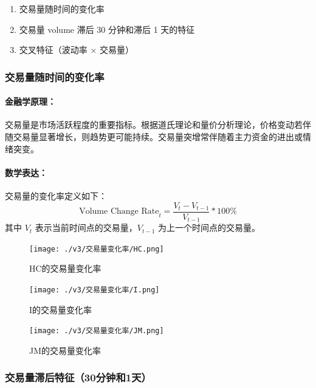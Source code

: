 \documentclass[a4paper,11pt]{ctexart}
\begin{document}
\begin{enumerate}
  \item 交易量随时间的变化率
  \item 交易量 volume 滞后 30 分钟和滞后 1 天的特征
  \item 交叉特征（波动率 $\times$ 交易量）
\end{enumerate}

\subsubsection{交易量随时间的变化率}

\paragraph{金融学原理：}

交易量是市场活跃程度的重要指标。根据道氏理论和量价分析理论，价格变动若伴随交易量显著增长，则趋势更可能持续。交易量突增常伴随着主力资金的进出或情绪突变。

\paragraph{数学表达：}

交易量的变化率定义如下：
\[
\text{Volume Change Rate}_t = \frac{V_t - V_{t-1}}{V_{t-1}}*100\%
\]
其中 $V_t$ 表示当前时间点的交易量，$V_{t-1}$ 为上一个时间点的交易量。
\FloatBarrier
\noindent
\begin{figure}[H]
  \centering

    \texttt{[image: ./v3/交易量变化率/HC.png]}
    \caption*{HC的交易量变化率}
  \end{figure}

  \begin{figure}[H]
    \centering
    \texttt{[image: ./v3/交易量变化率/I.png]}
    \caption*{I的交易量变化率}
  \end{figure}

  \begin{figure}[H]
    \centering
    \texttt{[image: ./v3/交易量变化率/JM.png]}
    \caption*{JM的交易量变化率}
  \end{figure}




\newpage

\subsubsection{交易量滞后特征（30分钟和1天）}
\end{document}
